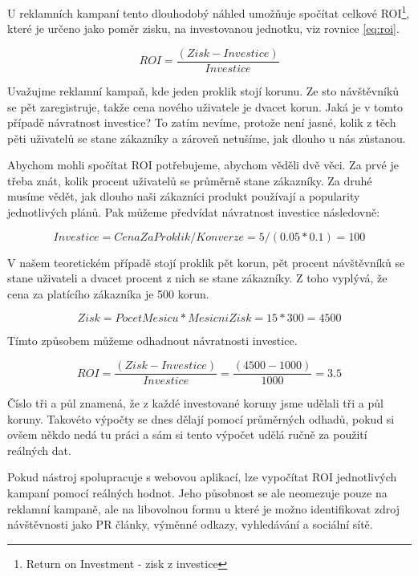 \documentclass[bc,male,java,dept456]{diploma}						%
\begin{document}
U reklamních kampaní tento dlouhodobý náhled umožňuje spočítat celkové ROI\footnote{Return on Investment - zisk z investice}, které je určeno jako poměr zisku, na investovanou jednotku, viz rovnice \ref{eq:roi}.

\begin{equation}\label{eq:roi}
ROI = \frac{(Zisk - Investice)}{Investice}
\end{equation}

Uvažujme reklamní kampaň, kde jeden proklik stojí korunu. Ze sto návštěvníků se pět zaregistruje, takže cena nového uživatele je dvacet korun. Jaká je v tomto případě návratnost investice? To zatím nevíme, protože není jasné, kolik z těch pěti uživatelů se stane zákazníky a zároveň netušíme, jak dlouho u nás zůstanou.

Abychom mohli spočítat ROI potřebujeme, abychom věděli dvě věci. Za prvé je třeba znát, kolik procent uživatelů se průměrně stane zákazníky. Za druhé musíme vědět, jak dlouho naši zákazníci produkt používají a popularity jednotlivých plánů. Pak můžeme předvídat návratnost investice následovně:


\begin{equation}\label{eq:roi2}
Investice = CenaZaProklik / Konverze = 5 / (0.05 * 0.1) = 100
\end{equation}

V našem teoretickém případě stojí proklik pět korun, pět procent návštěvníků se stane uživateli a dvacet procent z nich se stane zákazníky. Z toho vyplývá, že cena za platícího zákazníka je 500 korun.


\begin{equation}\label{eq:roi3}
Zisk = PocetMesicu * MesicniZisk = 15 * 300 = 4500
\end{equation}

Tímto způsobem můžeme odhadnout návratnosti investice.

\begin{equation}\label{eq:roi4}
ROI = \frac{(Zisk - Investice)}{Investice} = \frac{(4500 - 1000)}{1000} = 3.5
\end{equation}

Číslo tři a půl znamená, že z každé investované koruny jsme udělali tři a půl koruny. Takovéto výpočty se dnes dělají pomocí průměrných odhadů, pokud si ovšem někdo nedá tu práci a sám si tento výpočet udělá ručně za použití reálných dat.

Pokud nástroj spolupracuje s webovou aplikací, lze vypočítat ROI jednotlivých kampaní pomocí reálných hodnot. Jeho působnost se ale neomezuje pouze na reklamní kampaně, ale na libovolnou formu u které je možno identifikovat zdroj návštěvnosti jako PR články, výměnné odkazy, vyhledávání a sociální sítě.
\end{document}
